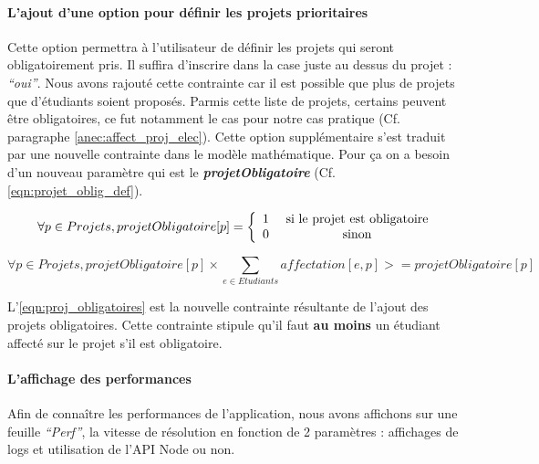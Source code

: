 \documentclass[final,poster]{polytech/polytech}
\begin{document}
\paragraph{L'ajout d'une option pour définir les projets prioritaires}
Cette option permettra à l'utilisateur de définir les projets qui seront obligatoirement pris. Il suffira d'inscrire dans la case juste au dessus du projet : \textit{“oui”}. 
Nous avons rajouté cette contrainte car il est possible que plus de projets que d'étudiants soient proposés. Parmis cette liste de projets, certains peuvent être obligatoires, ce fut notamment le cas pour notre cas pratique (Cf. paragraphe \autoref{anec:affect_proj_elec}).
Cette option supplémentaire s'est traduit par une nouvelle contrainte dans le modèle mathématique. Pour ça on a besoin d'un nouveau paramètre qui est le \textbf{\textit{projetObligatoire}} (Cf. \autoref{eqn:projet_oblig_def}).

\begin{equation}
\forall {p \in Projets}, projetObligatoire[p]=
\left\lbrace
\begin{array}{c c }
1 & \text{ si le projet est obligatoire} \\
0 & \text{ sinon}
\end{array}
\right.
\label{eqn:projet_oblig_def}
\end{equation}

\begin{equation}
\forall {p \in Projets}, projetObligatoire[p]\times\sum_{e \in Etudiants} affectation[e,p] >=projetObligatoire[p]
\label{eqn:proj_obligatoires}
\end{equation}


L'\autoref{eqn:proj_obligatoires} est la nouvelle contrainte résultante de l'ajout des projets obligatoires. Cette contrainte stipule qu'il faut \textbf{au moins} un étudiant affecté sur le projet s'il est obligatoire.

\paragraph{L'affichage des performances}
Afin de connaître les performances de l'application, nous avons affichons sur une feuille \textit{“Perf”}, la vitesse de résolution en fonction de 2 paramètres : affichages de logs et utilisation de l’API Node ou non.


\end{document}
